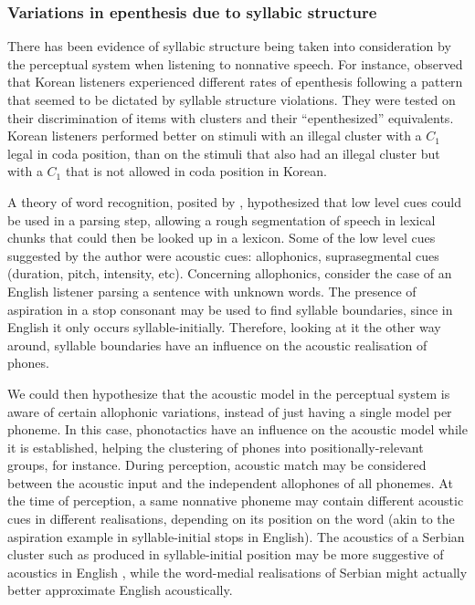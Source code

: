 {\subsubsection{Variations in epenthesis due to syllabic structure}
There has been evidence of syllabic structure being taken into consideration by the perceptual system when listening to nonnative speech. For instance, \cite{kabak2007} observed that Korean listeners experienced different rates of epenthesis following a pattern that seemed to be dictated by syllable structure violations. They were tested on their discrimination of items with clusters and their ``epenthesized'' equivalents. Korean listeners performed better on stimuli with an illegal cluster with a $C_{1}$ legal in coda position, than on the stimuli that also had an illegal cluster but with a $C_{1}$ that is not allowed in coda position in Korean.  

A theory of word recognition, posited by \cite{church1987}, hypothesized that low level cues could be used in a parsing step, allowing a rough segmentation of speech in lexical chunks that could then be looked up in a lexicon. Some of the low level cues suggested by the author were acoustic cues: allophonics, suprasegmental cues (duration, pitch, intensity, etc). Concerning allophonics, consider the case of an English listener parsing a sentence with unknown words. The presence of aspiration in a stop consonant may be used to find syllable boundaries, since in English it only occurs syllable-initially. Therefore, looking at it the other way around, syllable boundaries have an influence on the acoustic realisation of phones. 

We could then hypothesize that the acoustic model in the perceptual system is aware of certain allophonic variations, instead of just having a single model per phoneme. In this case, phonotactics have an influence on the acoustic model while it is established, helping the clustering of phones into positionally-relevant groups, for instance. During perception, acoustic match may be considered between the acoustic input and the independent allophones of all phonemes.
At the time of perception, a same nonnative phoneme may contain different acoustic cues in different realisations, depending on its position on the word (akin to the aspiration example in syllable-initial stops in English). The acoustics of a Serbian cluster such as  produced in syllable-initial position may be more suggestive of acoustics in English \textipa{[g@m]}, while the word-medial realisations of Serbian  might actually better approximate English \textipa{[gm]} acoustically.

}
